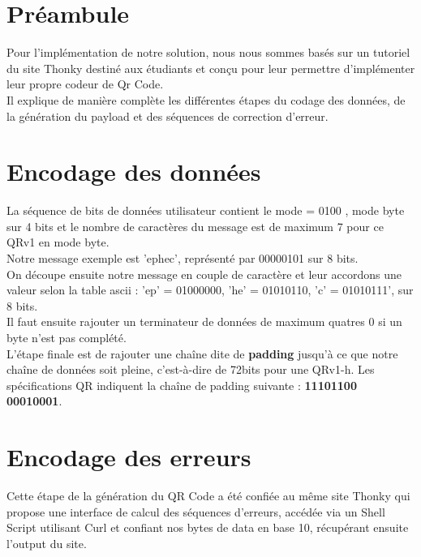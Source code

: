 \documentclass{report}
\begin{document}
	\section{Préambule}

		Pour l'implémentation de notre solution, nous nous sommes basés sur un tutoriel du site Thonky destiné aux étudiants et conçu pour leur permettre d'implémenter leur propre codeur de Qr Code.\\
		Il explique de manière complète les différentes étapes du codage des données, de la génération du payload et des séquences de correction d'erreur.\\

	\section{Encodage des données}

		La séquence de bits de données utilisateur contient le mode = 0100 , mode byte sur 4 bits et le nombre de caractères du message est de maximum 7 pour ce QRv1 en mode byte.\\
		Notre message exemple est 'ephec', représenté par 00000101 sur 8 bits.\\

		On découpe ensuite notre message en couple de caractère et leur accordons une valeur selon la table ascii : 'ep' = 01000000, 'he' = 01010110, 'c' = 01010111', sur 8 bits.\\

		Il faut ensuite rajouter un terminateur de données de maximum quatres 0 si un byte n'est pas complété.\\

		L'étape finale est de rajouter une chaîne dite de \textbf{padding} jusqu'à ce que notre chaîne de données soit pleine, c'est-à-dire de 72bits pour une QRv1-h. Les spécifications QR indiquent la chaîne de padding suivante : \textbf{11101100 00010001}.\\

	\section{Encodage des erreurs}

		Cette étape de la génération du QR Code a été confiée au même site Thonky qui propose une interface de calcul des séquences d'erreurs, accédée via un Shell Script utilisant Curl et confiant nos bytes de data en base 10, récupérant ensuite l'output du site.\\
\end{document}
